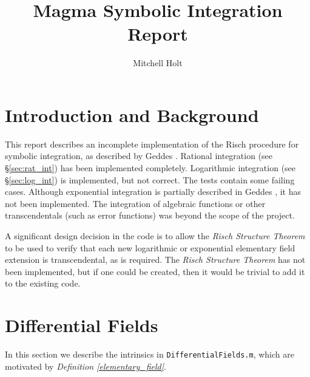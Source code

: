 \documentclass{article}
\title{Magma Symbolic Integration Report}
\author{Mitchell Holt}
\theoremstyle{plain}
\theoremstyle{definition}
\newcommand{\defref}[1]{\emph{Definition \ref{#1}}}
\begin{document}
\maketitle

\tableofcontents

\newpage

\section{Introduction and Background}

This report describes an incomplete implementation of the Risch procedure for
symbolic integration, as described by Geddes \cite{geddes:afca}. Rational
integration (see \S \ref{sec:rat_int}) has been implemented completely.
Logarithmic integration (see \S \ref{sec:log_int}) is implemented, but not
correct. The tests contain some failing cases. Although exponential integration
is partially described in Geddes \cite{geddes:afca}, it has not been
implemented. The integration of algebraic functions or other transcendentals
(such as error functions) was beyond the scope of the project. \medbreak

A significant design decision in the code is to allow the \emph{Risch Structure
Theorem} \cite{risch:algprops} to be used to verify that each new logarithmic or
exponential elementary field extension is transcendental, as is required. The
\emph{Risch Structure Theorem} has not been implemented, but if one could be
created, then it would be trivial to add it to the existing code.

\section{Differential Fields}

In this section we describe the intrinsics in \lstinline{DifferentialFields.m},
which are motivated by \defref{elementary_field}.
\end{document}
